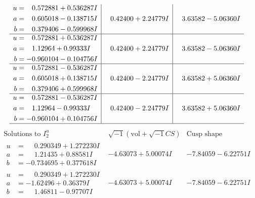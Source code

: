 \documentclass[1p]{elsarticle_modified}
\theoremstyle{definition}
\newcommand{\I}{\sqrt{-1}}
\begin{document}
$$\begin{array}{c|c|c}
\begin{aligned}
u &= \phantom{-}0.572881 + 0.536287 I \\
a &= \phantom{-}0.605018 - 0.138715 I \\
b &= \phantom{-}0.379406 - 0.599968 I\end{aligned}
 & \phantom{-}0.42400 + 2.24779 I & \phantom{-}3.63582 - 5.06360 I \\ \hline\begin{aligned}
u &= \phantom{-}0.572881 + 0.536287 I \\
a &= \phantom{-}1.12964 + 0.99333 I \\
b &= -0.960104 - 0.104756 I\end{aligned}
 & \phantom{-}0.42400 + 2.24779 I & \phantom{-}3.63582 - 5.06360 I \\ \hline\begin{aligned}
u &= \phantom{-}0.572881 - 0.536287 I \\
a &= \phantom{-}0.605018 + 0.138715 I \\
b &= \phantom{-}0.379406 + 0.599968 I\end{aligned}
 & \phantom{-}0.42400 - 2.24779 I & \phantom{-}3.63582 + 5.06360 I \\ \hline\begin{aligned}
u &= \phantom{-}0.572881 - 0.536287 I \\
a &= \phantom{-}1.12964 - 0.99333 I \\
b &= -0.960104 + 0.104756 I\end{aligned}
 & \phantom{-}0.42400 - 2.24779 I & \phantom{-}3.63582 + 5.06360 I\\
 \hline 
 \end{array}$$\newpage$$\begin{array}{c|c|c}  
\text{Solutions to }I^u_{2}& \I (\text{vol} + \sqrt{-1}CS) & \text{Cusp shape}\\
 \hline 
\begin{aligned}
u &= \phantom{-}0.290349 + 1.272230 I \\
a &= \phantom{-}1.21435 + 0.88581 I \\
b &= -0.734695 + 0.377618 I\end{aligned}
 & -4.63073 + 5.00074 I & -7.84059 - 6.22751 I \\ \hline\begin{aligned}
u &= \phantom{-}0.290349 + 1.272230 I \\
a &= -1.62496 + 0.36379 I \\
b &= \phantom{-}1.46811 - 0.97707 I\end{aligned}
 & -4.63073 + 5.00074 I & -7.84059 - 6.22751 I \\ \hline\begin{aligned}

\end{aligned}
\end{array}$$
\end{document}
